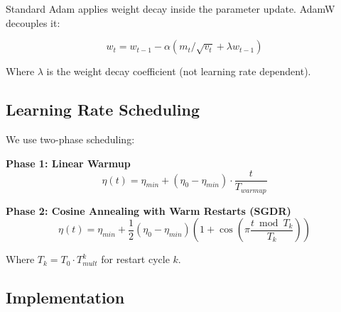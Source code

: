 \documentclass[12pt,a4paper,oneside]{report}
\begin{document}
Standard Adam applies weight decay inside the parameter update. AdamW decouples it:

\begin{equation}
w_t = w_{t-1} - \alpha(m_t/\sqrt{v_t} + \lambda w_{t-1})
\label{eq:adamw}
\end{equation}

Where $\lambda$ is the weight decay coefficient (not learning rate dependent).

\subsection{Learning Rate Scheduling}

We use two-phase scheduling:

\textbf{Phase 1: Linear Warmup}
\begin{equation}
\eta(t) = \eta_{min} + (\eta_0 - \eta_{min}) \cdot \frac{t}{T_{warmup}}
\label{eq:warmup}
\end{equation}

\textbf{Phase 2: Cosine Annealing with Warm Restarts (SGDR)}
\begin{equation}
\eta(t) = \eta_{min} + \frac{1}{2}(\eta_0 - \eta_{min})\left(1 + \cos\left(\pi \frac{t \bmod T_k}{T_k}\right)\right)
\label{eq:sgdr}
\end{equation}

Where $T_k = T_0 \cdot T_{mult}^k$ for restart cycle $k$.

\subsection{Implementation}
\end{document}

